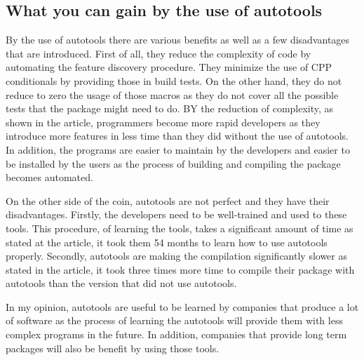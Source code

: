 \documentclass[11pt]{article}
\begin{document}
\subsection{What you can gain by the use of autotools}
By the use of autotools there are various benefits as well as a few disadvantages that are introduced. First of all, they reduce the complexity of code by automating the feature discovery procedure. They minimize the use of CPP conditionals by providing those in build tests. On the other hand, they do not reduce to zero the usage of those macros as they do not cover all the possible tests that the package might need to do. BY the reduction of complexity, as shown in the article, programmers become more rapid developers as they introduce more features in less time than they did without the use of autotools. In addition, the programs are easier to maintain by the developers and easier to be installed by the users as the process of building and compiling the package becomes automated.

On the other side of the coin, autotools are not perfect and they have their disadvantages. Firstly, the developers need  to be well-trained and used to these tools. This procedure, of learning the tools, takes a significant amount of time as stated at the article, it took them 54 months to learn how to use autotools properly. Secondly, autotools are making the compilation significantly slower as stated in the article, it took three times more time to compile their package with autotools than the version that did not use autotools.

In my opinion, autotools are useful to be learned by companies that produce a lot of software as the process of learning the autotools will provide them with less complex programs in the future. In addition, companies that provide long term packages will also be benefit by using those tools.


\end{document}
